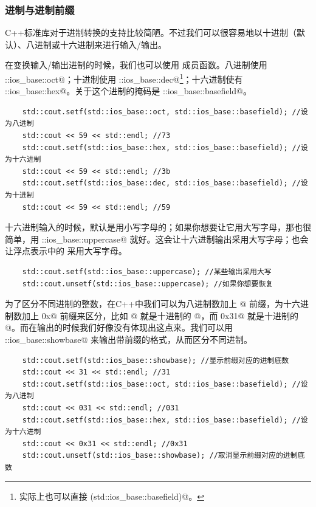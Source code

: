 \subsubsection*{进制与进制前缀}
C++标准库对于进制转换的支持比较简陋。不过我们可以很容易地以十进制（默认）、八进制或十六进制来进行输入/输出。\par
在变换输入/输出进制的时候，我们也可以使用 \lstinline@setf@ 成员函数。八进制使用 \lstinline@std::ios_base::oct@；十进制使用 \lstinline@std::ios_base::dec@\footnote{实际上也可以直接 \lstinline@unsetf(std::ios_base::basefield)@。}；十六进制使有 \lstinline@std::ios_base::hex@。关于这个进制的掩码是 \lstinline@std::ios_base::basefield@。
\begin{lstlisting}
    std::cout.setf(std::ios_base::oct, std::ios_base::basefield); //设为八进制
    std::cout << 59 << std::endl; //73
    std::cout.setf(std::ios_base::hex, std::ios_base::basefield); //设为十六进制
    std::cout << 59 << std::endl; //3b
    std::cout.setf(std::ios_base::dec, std::ios_base::basefield); //设为十进制
    std::cout << 59 << std::endl; //59
\end{lstlisting}\par
十六进制输入的时候，默认是用小写字母的；如果你想要让它用大写字母，那也很简单，用 \lstinline@std::ios_base::uppercase@ 就好。这会让十六进制输出采用大写字母；也会让浮点表示中的 \lstinline@e@ 采用大写字母。
\begin{lstlisting}
    std::cout.setf(std::ios_base::uppercase); //某些输出采用大写
    std::cout.unsetf(std::ios_base::uppercase); //如果你想要恢复
\end{lstlisting}\par
为了区分不同进制的整数，在C++中我们可以为八进制数加上 @ 前缀，为十六进制数加上 \lstinline@0x@ 前缀来区分，比如 @ 就是十进制的 @，而 \lstinline@0x31@ 就是十进制的 @。而在输出的时候我们好像没有体现出这点来。我们可以用 \lstinline@std::ios_base::showbase@ 来输出带前缀的格式，从而区分不同进制。
\begin{lstlisting}
    std::cout.setf(std::ios_base::showbase); //显示前缀对应的进制底数
    std::cout << 31 << std::endl; //31
    std::cout.setf(std::ios_base::oct, std::ios_base::basefield); //设为八进制
    std::cout << 031 << std::endl; //031
    std::cout.setf(std::ios_base::hex, std::ios_base::basefield); //设为十六进制
    std::cout << 0x31 << std::endl; //0x31
    std::cout.unsetf(std::ios_base::showbase); //取消显示前缀对应的进制底数
\end{lstlisting}\par
